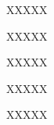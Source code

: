 \documentclass[11pt,b5paper]{book}
\begin{document}
\numberpstarttrue
\resumenumbering

\pstart{}XXXXX\pend

\pstart{}XXXXX\pend

\pstart{}XXXXX\pend

\pstart{}XXXXX\pend

\pstart{}XXXXX\pend

\numberpstartfalse
\endnumbering
\end{document}
